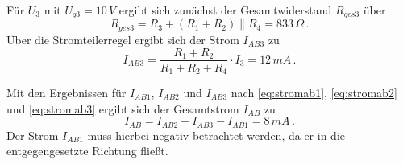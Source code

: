 Für $U_3$ mit $U_{q3}=10\,V$ ergibt sich zunächst der Gesamtwiderstand $R_{ges3}$ über
\begin{equation*}
    R_{ges3}=R_3+(R_1+R_2)\parallel R_4=833\,\Omega\, .
\end{equation*}
Über die Stromteilerregel ergibt sich der Strom $I_{AB3}$ zu
\begin{equation}
    \label{eq:stromab3}
    I_{AB3}=\frac{R_1 + R_2}{R_1+R_2+R_4}\cdot{I_{3}}=12\,mA\, .
\end{equation}

Mit den Ergebnissen für $I_{AB1}$, $I_{AB2}$ und $I_{AB3}$ nach \eqref{eq:stromab1}, \eqref{eq:stromab2} und \eqref{eq:stromab3}  ergibt sich der Gesamtstrom $I_{AB}$ zu
\begin{equation*}
    I_{AB}=I_{AB2}+I_{AB3}-I_{AB1}=8\,mA\, .
\end{equation*}
Der Strom $I_{AB1}$ muss hierbei negativ betrachtet werden, da er in die entgegengesetzte Richtung fließt.



